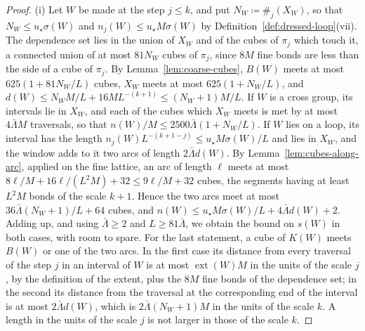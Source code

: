 \documentclass[11pt]{preprint}
\numberwithin{equation}{section}
\theoremstyle{definition}
\theoremstyle{remark}
\theoremstyle{plain}
\begin{document}
\begin{proof}
(i) Let $W$ be made at the step $j \leq k$, and put $N_W \coloneqq \#_j(X_W)$, so that $N_W \leq u_\star\sigma(W)$ and $n_j(W) \leq u_\star M\sigma(W)$ by Definition~\ref{def:dressed-loop}(vii). The dependence set lies in the union of $X_W$ and of the cubes of $\pi_j$ which touch it, a connected union of at most $81N_W$ cubes of $\pi_j$, since $8M$ fine bonds are less than the side of a cube of $\pi_j$. By Lemma~\ref{lem:coarse-cubes}, $B(W)$ meets at most $625(1 + 81N_W/L)$ cubes, $X_W$ meets at most $625(1 + N_W/L)$, and $d(W) \leq N_WM/L + 16ML^{-(k+1)} \leq (N_W + 1)M/L$. If $W$ is a cross group, its intervals lie in $X_W$, and each of the cubes which $X_W$ meets is met by at most $4\bar\Lambda M$ traversals, so that $n(W)/M \leq 2500\bar\Lambda(1 + N_W/L)$. If $W$ lies on a loop, its interval has the length $n_j(W)L^{-(k+1-j)} \leq u_\star M\sigma(W)/L$ and lies in $X_W$, and the window adds to it two arcs of length $2\bar\Lambda d(W)$. By Lemma~\ref{lem:cubes-along-arc}, applied on the fine lattice, an arc of length $\ell$ meets at most $8\ell/M + 16\ell/(L^2M) + 32 \leq 9\ell/M + 32$ cubes, the segments having at least $L^2M$ bonds of the scale $k + 1$. Hence the two arcs meet at most $36\bar\Lambda(N_W + 1)/L + 64$ cubes, and $n(W) \leq u_\star M\sigma(W)/L + 4\bar\Lambda d(W) + 2$. Adding up, and using $\bar\Lambda \geq 2$ and $L \geq 81\bar\Lambda$, we obtain the bound on $s(W)$ in both cases, with room to spare. For the last statement, a cube of $K(W)$ meets $B(W)$ or one of the two arcs. In the first case its distance from every traversal of the step $j$ in an interval of $W$ is at most $\operatorname{ext}(W)M$ in the units of the scale $j$, by the definition of the extent, plus the $8M$ fine bonds of the dependence set; in the second its distance from the traversal at the corresponding end of the interval is at most $2\bar\Lambda d(W)$, which is $2\bar\Lambda(N_W + 1)M$ in the units of the scale $k$. A length in the units of the scale $j$ is not larger in those of the scale $k$.


\end{proof}
\end{document}
